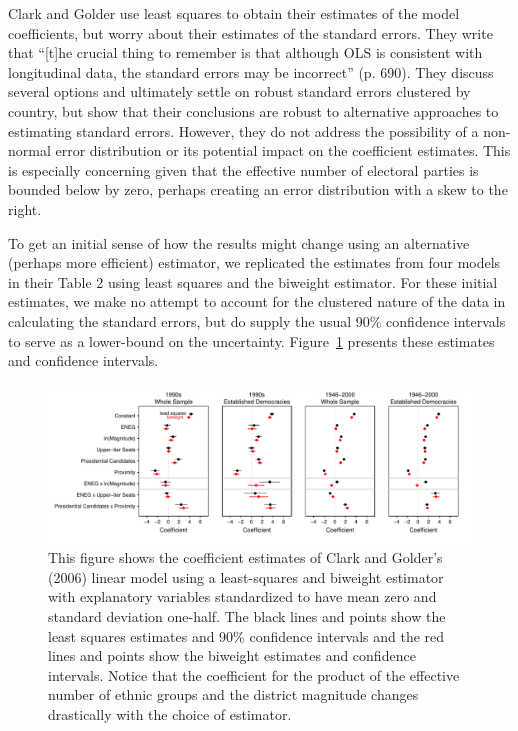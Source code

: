 \documentclass[12pt]{article}
\begin{document}
Clark and Golder use least squares to obtain their estimates of the model coefficients, but worry about their estimates of the standard errors. 
They write that ``[t]he crucial thing to remember is that although OLS is consistent with longitudinal data, the standard errors may be incorrect'' (p. 690). 
They discuss several options and ultimately settle on robust standard errors clustered by country, but show that their conclusions are robust to alternative approaches to estimating standard errors. 
However, they do not address the possibility of a non-normal error distribution or its potential impact on the coefficient estimates. 
This is especially concerning given that the effective number of electoral parties is bounded below by zero, perhaps creating an error distribution with a skew to the right. 

To get an initial sense of how the results might change using an alternative (perhaps more efficient) estimator, we replicated the estimates from four models in their Table 2 using least squares and the biweight estimator. 
For these initial estimates, we make no attempt to account for the clustered nature of the data in calculating the standard errors, but do supply the usual 90\% confidence intervals to serve as a lower-bound on the uncertainty. 
Figure~\ref{fig:cg-coef-plots} presents these estimates and confidence intervals.

\begin{figure}[h!]
\begin{center}
\includegraphics[scale = .8]{figs/cg-coef-plots.pdf}
\caption{This figure shows the coefficient estimates of Clark and Golder's (2006) linear model using a least-squares and biweight estimator with explanatory variables standardized to have mean zero and standard deviation one-half. 
The black lines and points show the least squares estimates and 90\% confidence intervals and the red lines and points show the biweight estimates and confidence intervals. 
Notice that the coefficient for the product of the effective number of ethnic groups and the district magnitude changes drastically with the choice of estimator.}\label{fig:cg-coef-plots}
\end{center}
\end{figure}
\end{document}
